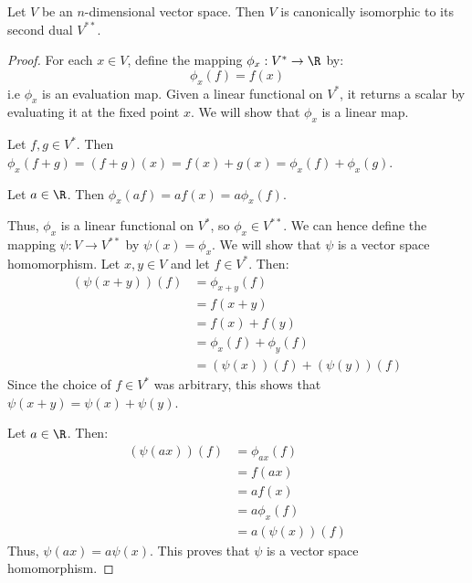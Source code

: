 \begin{theorem}
  Let \( V \) be an \( n \)-dimensional vector space. Then \( V \) is canonically isomorphic to its second dual \( V^{**} \).
\end{theorem}
\begin{proof}
  For each \( x\in V \), define the mapping \( \phi_x:V^*\to\R \) by:
  \[ \phi_x(f)=f(x) \]
  i.e \( \phi_x \) is an evaluation map. Given a linear functional on \( V^* \), it returns a scalar by evaluating it at the fixed point \( x \). We will show that \( \phi_x\) is a linear map.

  \vspace{3mm}

  Let \( f,g\in V^* \). Then \( \phi_x(f+g)=(f+g)(x)=f(x)+g(x)=\phi_x(f)+\phi_x(g) \).

  Let \( a\in\R \). Then \( \phi_x(af)=af(x)=a\phi_x(f) \).

  \vspace{3mm}

  Thus, \( \phi_x \) is a linear functional on \( V^* \), so \( \phi_x\in V^{**} \). We can hence define the mapping \( \psi:V\to V^{**} \) by \( \psi(x)=\phi_x \). We will show that \( \psi \) is a vector space homomorphism. Let \( x,y\in V \) and let \( f\in V^*\). Then:
  \begin{align*}
    (\psi(x+y))(f)&= \phi_{x+y}(f)\\
    &= f(x+y)\\
    &= f(x)+f(y)\\
    &= \phi_x(f)+\phi_y(f)\\
    &= (\psi(x))(f)+(\psi(y))(f)
  \end{align*}
  Since the choice of \( f\in V^* \) was arbitrary, this shows that \( \psi(x+y)=\psi(x)+\psi(y) \).

  \vspace{3mm}

  Let \( a\in\R \). Then:
  \begin{align*}
    (\psi(ax))(f)&= \phi_{ax}(f)\\
    &= f(ax)\\
    &= af(x)\\
    &= a\phi_x(f)\\
    &= a(\psi(x))(f)
  \end{align*}
  Thus, \( \psi(ax)=a\psi(x) \). This proves that \( \psi \) is a vector space homomorphism.

  \vspace{3mm}


\end{proof}
